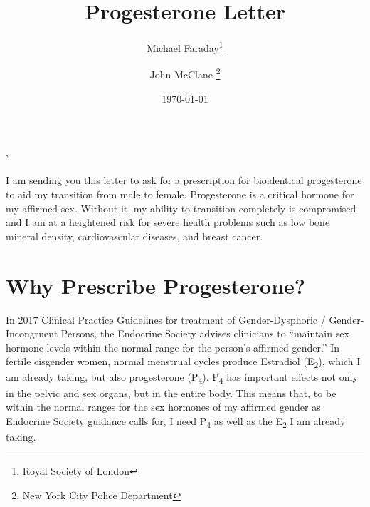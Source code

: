 \documentclass[
	secnumdepth=3, %
]{kaohandt}
\newcommand\tsub[1]{\textsubscript{#1}}
\begin{document}

\title[Progesterone Letter]{Progesterone Letter}

\author[MF, JMC]{Michael Faraday\thanks{Royal Society of London} \and John McClane \thanks{New York City Police Department}}

\date{\today}




,\\\\
I am sending you this letter to ask for a prescription for bioidentical progesterone to aid my transition from male to female. Progesterone is a critical hormone for my affirmed sex. Without it, my ability to transition completely is compromised and I am at a heightened risk for severe health problems such as low bone mineral density, cardiovascular diseases, and breast cancer.



\section{Why Prescribe Progesterone?}
In 2017 Clinical Practice Guidelines for treatment of Gender-Dysphoric / Gender-Incongruent Persons, the Endocrine Society advises clinicians to ``maintain sex hormone levels within the normal range for the person's affirmed gender.'' In fertile cisgender women, normal menstrual cycles produce Estradiol (E\tsub{2}), which I am already taking, but also progesterone (P\tsub{4}). P\tsub{4} has important effects not only in the pelvic and sex organs, but in the entire body. This means that, to be within the normal ranges for the sex hormones of my affirmed gender as Endocrine Society guidance calls for, I need P\tsub{4} as well as the E\tsub{2} I am already taking.\\
\end{document}
